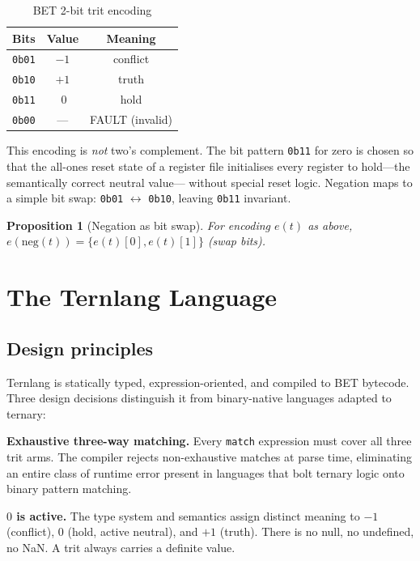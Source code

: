\documentclass[journal,10pt,twocolumn]{IEEEtran}
\newtheorem{proposition}{Proposition}
\begin{document}
\begin{table}[h]
\centering
\small
\caption{BET 2-bit trit encoding}
\label{tab:encoding}
\begin{tabular}{ccc}
\toprule
Bits & Value & Meaning \\
\midrule
\texttt{0b01} & $-1$ & conflict \\
\texttt{0b10} & $+1$ & truth \\
\texttt{0b11} & $\ 0$ & hold \\
\texttt{0b00} & --- & FAULT (invalid) \\
\bottomrule
\end{tabular}
\end{table}

This encoding is \emph{not} two's complement. The bit pattern \texttt{0b11}
for zero is chosen so that the all-ones reset state of a register file
initialises every register to hold—the semantically correct neutral value—
without special reset logic. Negation maps to a simple bit swap:
\texttt{0b01} $\leftrightarrow$ \texttt{0b10}, leaving \texttt{0b11}
invariant.

\begin{proposition}[Negation as bit swap]
For encoding $e(t)$ as above, $e(\mathrm{neg}(t)) = \{e(t)[0], e(t)[1]\}$
(swap bits).
\end{proposition}

\section{The Ternlang Language}
\label{sec:language}

\subsection{Design principles}

Ternlang is statically typed, expression-oriented, and compiled to BET
bytecode. Three design decisions distinguish it from binary-native languages
adapted to ternary:

\textbf{Exhaustive three-way matching.} Every \texttt{match} expression must
cover all three trit arms. The compiler rejects non-exhaustive matches at
parse time, eliminating an entire class of runtime error present in languages
that bolt ternary logic onto binary pattern matching.

\textbf{$0$ is active.} The type system and semantics assign distinct meaning
to $-1$ (conflict), $0$ (hold, active neutral), and $+1$ (truth). There is no
null, no undefined, no NaN. A trit always carries a definite value.
\end{document}
